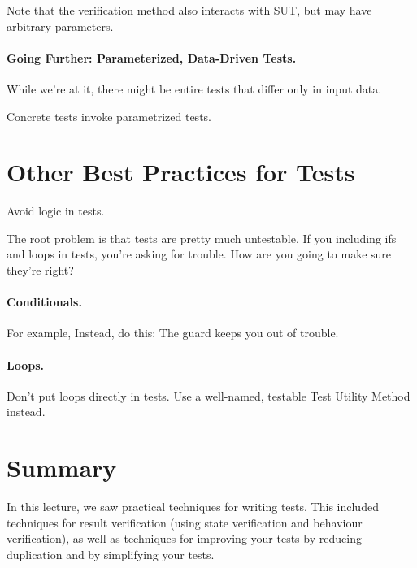 \documentclass[11pt]{article}
\begin{document}

Note that the verification method also interacts with SUT, but
may have arbitrary parameters.

\paragraph{Going Further: Parameterized, Data-Driven Tests.}
While we're at it,
there might be entire tests 
that differ only in input data.

Concrete tests invoke parametrized tests.

\newpage
\section*{Other Best Practices for Tests}
Avoid logic in tests.

The root problem is that tests are pretty much untestable.
If you including ifs and loops in tests, you're asking for trouble.
How are you going to make sure they're right?

\paragraph{Conditionals.} For example,
Instead, do this:
The guard keeps you out of trouble.

\paragraph{Loops.}
    Don't put loops directly in tests.
    Use a well-named, testable Test Utility Method instead.

\section*{Summary}
In this lecture, we saw practical techniques for writing tests.
This included techniques for result verification (using state
verification and behaviour verification), as well as techniques
for improving your tests by reducing duplication and by simplifying
your tests.
\end{document}
